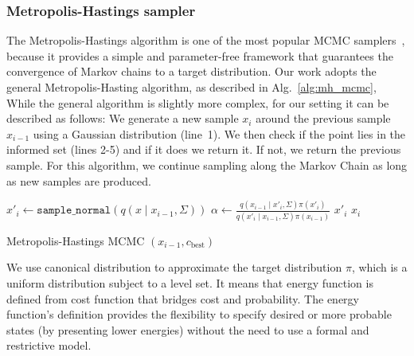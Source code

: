 \documentclass[letterpaper, 10 pt, conference]{ieeeconf}  %
\begin{document}
\subsubsection{Metropolis-Hastings sampler}

The Metropolis-Hastings algorithm is one of the most popular MCMC samplers~\cite{CG95}, because it provides a simple and parameter-free framework that guarantees the convergence of Markov chains to a target distribution.
Our work adopts the general Metropolis-Hasting algorithm, as described in Alg.~\ref{alg:mh_mcmc}, 
While the general algorithm is slightly more complex, for our setting it can be described as follows:
We generate a new sample $ x_{i}$ around the previous sample $ x_{i-1}$ using a Gaussian distribution (line~1).
We then check if the point lies in the informed set (lines 2-5) and if it does we return it.
If not, we return the previous sample.
%
For this algorithm, we continue sampling along the Markov Chain as long as new samples are produced.

\begin{algorithm}[t]
	\begin{algorithmic}[1]
		\STATE $ x'_{i} \leftarrow \texttt{sample\_normal}( q ( x \mid x_{i-1},\Sigma) ) $ 
		\label{start}
		\STATE $ \alpha \leftarrow \frac{ q ( x_{i-1} \mid x'_{i},\Sigma) \pi( x'_{i} ) }{ q ( x'_{i} \mid x_{i-1},\Sigma) \pi( x_{i-1} ) } $
            \RETURN $ x'_{i} $
		\ENDIF
		\RETURN $ x_{i} $
	\end{algorithmic}
	\caption{Metropolis-Hastings MCMC $(x_{i-1}, c_{\text{best}})$}
	\label{alg:mh_mcmc}	
\end{algorithm}

We use canonical distribution to approximate the target distribution $ \pi $, which is a uniform distribution subject to a level set.
It means that energy function is defined from cost function that bridges cost and probability.
The energy function's definition provides the flexibility to specify desired or more probable states (by presenting lower energies) without the need to use a formal and restrictive model. 
\end{document}

